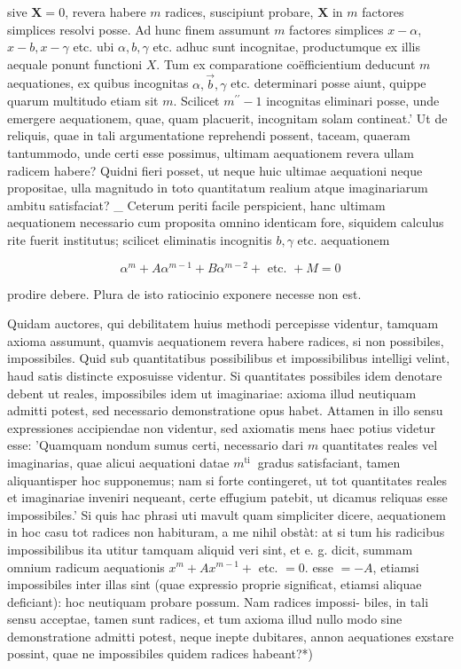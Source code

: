 \documentclass[twoside,12pt, showframe]{memoir}
\begin{document}
sive \(\boldsymbol{X}=0\), revera habere \(m\) radices, suscipiunt probare, \(\boldsymbol{X}\) in \(m\) factores simplices resolvi posse. Ad hunc finem assumunt \(m\) factores simplices \(x-\alpha\), \(x-b, x-\gamma\) etc. ubi \(\alpha, b, \gamma\) etc. adhuc sunt incognitae, productumque ex illis aequale ponunt functioni \(X\). Tum ex comparatione coëfficientium deducunt \(m\) aequationes, ex quibus incognitas \(\alpha, \vec{b}, \gamma\) etc. determinari posse aiunt, quippe quarum multitudo etiam sit \(m\). Scilicet \(m^{\prime \prime}-1\) incognitas eliminari posse, unde emergere aequationem, quae, quam placuerit, incognitam solam contineat.' Ut de reliquis, quae in tali argumentatione reprehendi possent, taceam, quaeram tantummodo, unde certi esse possimus, ultimam aequationem revera ullam radicem habere? Quidni fieri posset, ut neque huic ultimae aequationi neque propositae, ulla magnitudo in toto quantitatum realium atque imaginariarum ambitu satisfaciat? \_ Ceterum periti facile perspicient, hanc ultimam aequationem necessario cum proposita omnino identicam fore, siquidem calculus rite fuerit institutus; scilicet eliminatis incognitis \(b, \gamma\) etc. aequationem

\[
\alpha^{m}+A \alpha^{m-1}+B \alpha^{m-2}+\text { etc. }+M=0
\]

prodire debere. Plura de isto ratiocinio exponere necesse non est.

Quidam auctores, qui debilitatem huius methodi percepisse videntur, tamquam axioma assumunt, quamvis aequationem revera habere radices, si non possibiles, impossibiles. Quid sub quantitatibus possibilibus et impossibilibus intelligi velint, haud satis distincte exposuisse videntur. Si quantitates possibiles idem denotare debent ut reales, impossibiles idem ut imaginariae: axioma illud neutiquam admitti potest, sed necessario demonstratione opus habet. Attamen in illo sensu expressiones accipiendae non videntur, sed axiomatis mens haec potius videtur esse: 'Quamquam nondum sumus certi, necessario dari \(m\) quantitates reales vel imaginarias, quae alicui aequationi datae \(m^{\text {ti }}\) gradus satisfaciant, tamen aliquantisper hoc supponemus; nam si forte contingeret, ut tot quantitates reales et imaginariae inveniri nequeant, certe effugium patebit, ut dicamus reliquas esse impossibiles.' Si quis hac phrasi uti mavult quam simpliciter dicere, aequationem in hoc casu tot radices non habituram, a me nihil obstàt: at si tum his radicibus impossibilibus ita utitur tamquam aliquid veri sint, et e. g. dicit, summam omnium radicum aequationis \(x^{m}+A x^{m-1}+\) etc. \(=0\). esse \(=-A\), etiamsi impossibiles inter illas sint (quae expressio proprie significat, etiamsi aliquae deficiant): hoc neutiquam probare possum. Nam radices impossi-
biles, in tali sensu acceptae, tamen sunt radices, et tum axioma illud nullo modo sine demonstratione admitti potest, neque inepte dubitares, annon aequationes exstare possint, quae ne impossibiles quidem radices habeant?*)
\end{document}
